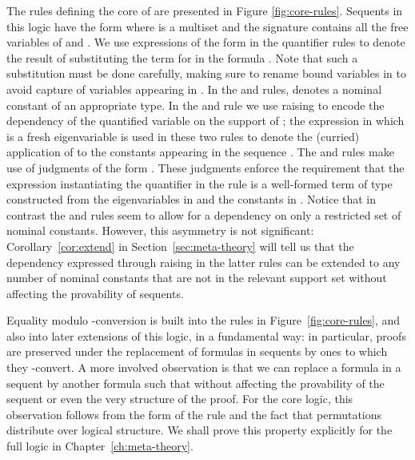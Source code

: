 \begin{figure*}[t]
\small








\caption{The core rules of \logic}
\label{fig:core-rules}
\end{figure*}

The rules defining the core of \logic are presented in Figure
\ref{fig:core-rules}. Sequents in this logic have the form  where  is a multiset and the signature 
contains all the free variables of  and . We use
expressions of the form  in the quantifier rules to denote the
result of substituting the term  for  in the formula . Note
that such a substitution must be done carefully, making sure to rename
bound variables in  to avoid capture of variables appearing in .
In the  and  rules,  denotes
a nominal constant of an appropriate type. In the 
and  rule we use raising \cite{miller92jsc} to
encode the dependency of the quantified variable on the support of
; the expression  in which  is a fresh
eigenvariable is used in these two rules to denote the (curried)
application of  to the constants appearing in the sequence
. The  and  rules
make use of judgments of the form . These judgments enforce the requirement that the
expression  instantiating the quantifier in the rule is a
well-formed term of type  constructed from the eigenvariables in
 and the constants in . Notice that in
contrast the  and  rules seem
to allow for a dependency on only a restricted set of nominal
constants. However, this asymmetry is not significant:
Corollary~\ref{cor:extend} in Section~\ref{sec:meta-theory} will tell
us that the dependency expressed through raising in the latter rules
can be extended to any number of nominal constants that are not in the
relevant support set without affecting the provability of sequents.

Equality modulo -conversion is built into the rules in
Figure~\ref{fig:core-rules}, and also into later extensions of
this logic, in a fundamental way: in particular, proofs are preserved
under the replacement of formulas in sequents by ones to which they
-convert.  A more involved observation
is that we can replace a formula  in a sequent by another formula
 such that  without affecting the provability of the
sequent or even the very structure of the proof. For the core logic,
this observation follows from the form of the  rule and the fact
that permutations distribute over logical structure. We shall prove
this property explicitly for the full logic in
Chapter~\ref{ch:meta-theory}.

